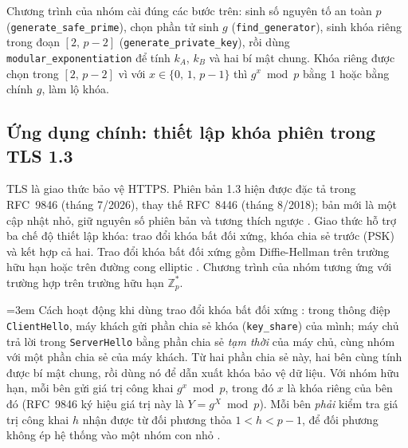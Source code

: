 Chương trình của nhóm cài đúng các bước trên: sinh số nguyên tố an toàn $p$
(\texttt{generate\_\allowbreak safe\_\allowbreak prime}), chọn phần tử sinh $g$
(\texttt{find\_\allowbreak generator}), sinh khóa riêng trong đoạn $[2,\,p-2]$
(\texttt{generate\_\allowbreak private\_\allowbreak key}), rồi dùng \texttt{modular\_\allowbreak exponentiation} để
tính $k_A$, $k_B$ và hai bí mật chung. Khóa riêng được chọn trong $[2,\,p-2]$ vì với $x \in \{0,\,1,\,p-1\}$ thì
$g^x \bmod p$ bằng $1$ hoặc bằng chính $g$, làm lộ khóa.

\subsection{Ứng dụng chính: thiết lập khóa phiên trong TLS 1.3}

TLS là giao thức bảo vệ HTTPS. Phiên bản 1.3 hiện được đặc tả trong RFC~9846
(tháng 7/2026), thay thế RFC~8446 (tháng 8/2018); bản mới là một cập nhật nhỏ,
giữ nguyên số phiên bản và tương thích ngược \cite{rfc9846}. Giao thức hỗ trợ ba
chế độ thiết lập khóa: trao đổi khóa bất đối xứng, khóa chia sẻ trước (PSK) và
kết hợp cả hai. Trao đổi khóa bất đối xứng gồm Diffie-Hellman trên trường hữu hạn
hoặc trên đường cong elliptic \cite{rfc9846}. Chương trình của nhóm tương ứng với
trường hợp trên trường hữu hạn $\mathbb{Z}_p^*$.

{\emergencystretch=3em Cách hoạt động khi dùng trao đổi khóa bất đối xứng \cite{rfc9846}: trong thông
điệp \texttt{ClientHello}, máy khách gửi phần chia sẻ khóa
(\texttt{key\_\allowbreak share}) của mình; máy chủ trả lời trong \texttt{ServerHello} bằng
phần chia sẻ \emph{tạm thời} của máy chủ, cùng nhóm với một phần chia sẻ của máy
khách. Từ hai phần chia sẻ này, hai bên cùng tính được bí mật chung, rồi dùng nó
để dẫn xuất khóa bảo vệ dữ liệu. Với nhóm hữu hạn, mỗi bên gửi giá trị công khai $g^{x} \bmod p$, trong đó $x$ là khóa riêng của bên đó (RFC~9846 ký hiệu giá trị này là $Y = g^X \bmod p$). Mỗi bên \emph{phải} kiểm tra giá trị công khai $h$ nhận được từ đối phương thỏa $1 < h < p-1$, để đối phương không ép hệ thống vào một nhóm con nhỏ \cite{rfc9846}.\par}

